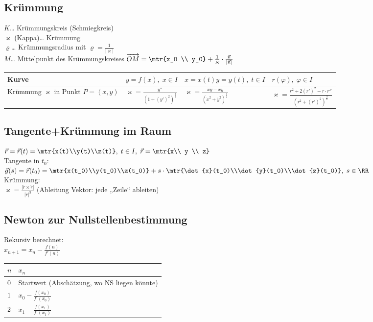 \documentclass{scrreprt}
\begin{document}
\subsection{Krümmung}
$K$… Krümmungskreis (Schmiegkreis)\\
$\varkappa$ (Kappa)… Krümmung\\
$\varrho$… Krümmungsradius mit $\varrho=\frac{1}{|\varkappa|}$\\
$M$… Mittelpunkt des Krümmungskreises $\overrightarrow{OM}=\mtr{x_0 \\ y_0}+\frac{1}{\varkappa}\cdot \frac{\vec{n}}{|\vec{n}|}$\\
\begin{tabular}{L{.2} | L{.3} | L{.199} | L{.3}}
Kurve & $y=f(x),\;x\in I$ & $x=x(t)$\newline $y=y(t), \; t\in I$ & $r(\varphi), \; \varphi \in I$ \\
\hline 
Krümmung $\varkappa$ in Punkt $P=(x,y)$ & $\varkappa=\frac{y''}{(1+(y')^2)^{\tfrac{3}{2}}}$ & $\varkappa=\frac{\dot{x}\ddot{y}-\ddot{x}\dot{y}}{(\dot{x}^2+\dot{y}^2)^{\tfrac{3}{2}}}$ & $\varkappa=\frac{r^2+2(r')^2-r\cdot r''}{(r^2+(r')^2)^{\tfrac{3}{2}}}$
\end{tabular}

\subsection{Tangente+Krümmung im Raum}
$\vec{r}=\vec{r}(t)=\mtr{x(t)\\y(t)\\z(t)}, \; t \in I, \; \vec{r}=\mtr{x\\ y \\ z}$\\
Tangente in $t_0$:\\
$\vec{g}(s)=\vec{r}(t_0)=\mtr{x(t_0)\\y(t_0)\\z(t_0)}+s\cdot \mtr{\dot{x}(t_0)\\\dot{y}(t_0)\\\dot{z}(t_0)}, \; s \in \RR$\\
Krümmung:\\
$\varkappa = \frac{|\dot{r}\times \ddot{r}|}{|\dot{r}|^3}$ (Ableitung Vektor: jede „Zeile“ ableiten)

\subsection{Newton zur Nullstellenbestimmung}
Rekursiv berechnet:\\
$x_{n+1}=x_n-\frac{f(n)}{f'(n)}$\\
\begin{tabular}{l | l}
$n$ & $x_n$\\
\hline 
$0$ & Startwert (Abschätzung, wo NS liegen könnte)\\
$1$ & $x_0-\frac{f(x_0)}{f'(x_0)}$\\
$2$ & $x_1-\frac{f(x_1)}{f'(x_1)}$
\end{tabular}
\end{document}
